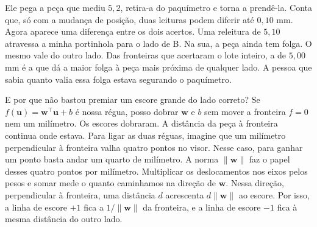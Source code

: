 Ele pega a peça que mediu $5{,}2$, retira-a do paquímetro e torna a prendê-la. Conta que, só com a mudança de posição, duas leituras podem diferir até $0{,}10$ mm. Agora aparece uma diferença entre os dois acertos. Uma releitura de $5{,}10$ atravessa a minha portinhola para o lado de B. Na sua, a peça ainda tem folga. O mesmo vale do outro lado. Das fronteiras que acertaram o lote inteiro, a de $5{,}00$ mm é a que dá a maior folga à peça mais próxima de qualquer lado. A pessoa que sabia quanto valia essa folga estava segurando o paquímetro.

E por que não bastou premiar um escore grande do lado correto? Se $f(\boldsymbol u)=\boldsymbol w^\top\boldsymbol u+b$ é nossa régua, posso dobrar $\boldsymbol w$ e $b$ sem mover a fronteira $f=0$ nem um milímetro. Os escores dobraram. A distância da peça à fronteira continua onde estava. Para ligar as duas réguas, imagine que um milímetro perpendicular à fronteira valha quatro pontos no visor. Nesse caso, para ganhar um ponto basta andar um quarto de milímetro. A norma $\lVert\boldsymbol w\rVert$ faz o papel desses quatro pontos por milímetro. Multiplicar os deslocamentos nos eixos pelos pesos e somar mede o quanto caminhamos na direção de $\boldsymbol w$. Nessa direção, perpendicular à fronteira, uma distância $d$ acrescenta $d\lVert\boldsymbol w\rVert$ ao escore. Por isso, a linha de escore $+1$ fica a $1/\lVert\boldsymbol w\rVert$ da fronteira, e a linha de escore $-1$ fica à mesma distância do outro lado.

